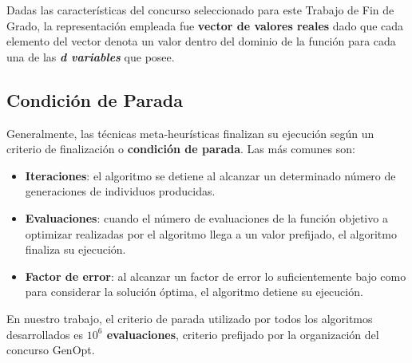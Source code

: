 Dadas las características del concurso seleccionado para este Trabajo de Fin de Grado, la representación empleada fue \textbf{vector de valores reales} dado que cada elemento del vector denota un valor dentro del dominio de la función para cada una de las \textbf{\textit{d variables}} que posee.

\subsection{Condición de Parada}
Generalmente, las técnicas meta-heurísticas finalizan su ejecución según un criterio de finalización o \textbf{condición de parada}. Las más comunes son: 

\bigskip

\begin{itemize}
    \item \textbf{Iteraciones}: el algoritmo se detiene al alcanzar un determinado número de generaciones de individuos producidas.
    \item \textbf{Evaluaciones}: cuando el número de evaluaciones de la función objetivo a optimizar realizadas por el algoritmo llega a un valor prefijado, el algoritmo finaliza su ejecución.
    \item \textbf{Factor de error}: al alcanzar un factor de error lo suficientemente bajo como para considerar la solución óptima, el algoritmo detiene su ejecución.
\end{itemize}

En nuestro trabajo, el criterio de parada utilizado por todos los algoritmos desarrollados es \textbf{$10^{6}$ evaluaciones}, criterio prefijado por la organización del concurso GenOpt. 
